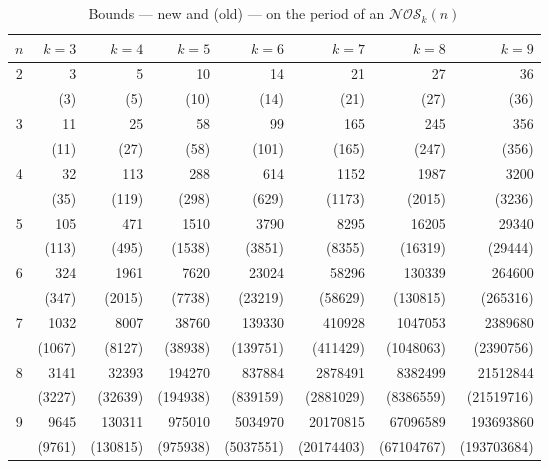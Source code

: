 \documentclass[a4paper,11pt]{article}
\theoremstyle{plain}
\theoremstyle{definition}
\theoremstyle{remark}
\begin{document}
\begin{table}[htb]
\centering \caption{Bounds --- new and (old) --- on the period of an $\mathcal{NOS}_k(n)$}
\label{table:new_NOS_periods_bounds}
\begin{footnotesize}
\begin{tabular}{crrrrrrr} \hline
$n$ & $k=3$  & $k=4$   & $k=5$   & $k=6$    & $k=7$     & $k=8$     & $k=9$       \\ \hline
2   & 3      & 5       & 10      & 14       & 21        & 27        & 36         \\
    & (3)    & (5)     & (10)    & (14)     & (21)      & (27)      & (36)       \\ \hline
3   & 11     & 25      & 58      & 99       & 165       & 245       & 356        \\
    & (11)   & (27)    & (58)    & (101)    & (165)     & (247)     & (356)      \\ \hline
4   & 32     & 113     & 288     & 614      & 1152      & 1987      & 3200       \\
    & (35)   & (119)   & (298)   & (629)    & (1173)    & (2015)    & (3236)     \\ \hline
5   & 105    & 471     & 1510    & 3790     & 8295      & 16205     & 29340      \\
    & (113)  & (495)   & (1538)  & (3851)   & (8355)    & (16319)   & (29444)     \\ \hline
6   & 324    & 1961    & 7620    & 23024    & 58296     & 130339    & 264600     \\
    & (347)  & (2015)  & (7738)  & (23219)  & (58629)   & (130815)  & (265316)   \\ \hline
7   & 1032   & 8007    & 38760   & 139330   & 410928    & 1047053   & 2389680    \\
    & (1067) & (8127)  & (38938) & (139751) & (411429)  & (1048063)  & (2390756) \\ \hline
8   & 3141   & 32393   & 194270  & 837884   & 2878491   & 8382499   & 21512844   \\
    & (3227) & (32639) & (194938)& (839159) & (2881029) & (8386559) & (21519716) \\ \hline
9   & 9645   & 130311  & 975010  & 5034970  & 20170815  & 67096589  & 193693860  \\
    & (9761) & (130815)& (975938)& (5037551)& (20174403)& (67104767)& (193703684)\\ \hline
\end{tabular}
\end{footnotesize}

\end{table}
\end{document}

